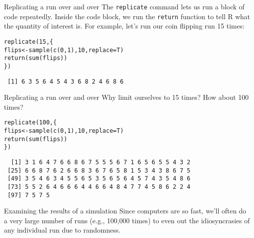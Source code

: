 \documentclass{beamer}\usepackage[]{graphicx}\usepackage[]{color}
\makeatletter
\newcommand{\hlnum}[1]{\textcolor[rgb]{0.824,0.412,0.118}{#1}}%
\newcommand{\hlstd}[1]{\textcolor[rgb]{1,0.894,0.769}{#1}}%
\newcommand{\hlkwb}[1]{\textcolor[rgb]{0.804,0.776,0.451}{#1}}%
\newcommand{\hlkwc}[1]{\textcolor[rgb]{0.78,0.941,0.545}{#1}}%
\newcommand{\hlkwd}[1]{\textcolor[rgb]{1,0.78,0.769}{#1}}%
\newenvironment{kframe}{%
 \def\at@end@of@kframe{}%
 \ifinner\ifhmode%
  \def\at@end@of@kframe{\end{minipage}}%
  \begin{minipage}{\columnwidth}%
 \fi\fi%
 \def\FrameCommand##1{\hskip\@totalleftmargin \hskip-\fboxsep
 \colorbox{shadecolor}{##1}\hskip-\fboxsep
     \hskip-\linewidth \hskip-\@totalleftmargin \hskip\columnwidth}%
 \MakeFramed {\advance\hsize-\width
   \@totalleftmargin\z@ \linewidth\hsize
   \@setminipage}}%
 {\par\unskip\endMakeFramed%
 \at@end@of@kframe}
\newenvironment{knitrout}{}{} %
\makeatother
\begin{document}
\begin{darkframes}
\begin{frame}[fragile]{Replicating a run over and over}
      The \texttt{replicate} command lets us run a block of code repeatedly. Inside the code block, we run the \texttt{return} function to tell R what the quantity of interest is. For example, let's run our coin flipping run 15 times:

\begin{knitrout}
\begin{kframe}
\begin{alltt}
\hlkwd{replicate}\hlstd{(}\hlnum{15}\hlstd{, \{}
  \hlstd{flips} \hlkwb{<-} \hlkwd{sample}\hlstd{(}\hlkwd{c}\hlstd{(}\hlnum{0}\hlstd{,} \hlnum{1}\hlstd{),} \hlnum{10}\hlstd{,} \hlkwc{replace}\hlstd{=T)}
  \hlkwd{return}\hlstd{(}\hlkwd{sum}\hlstd{(flips))}
\hlstd{\})}
\end{alltt}
\begin{verbatim}
 [1] 6 3 5 6 4 5 4 3 6 8 2 4 6 8 6
\end{verbatim}
\end{kframe}
\end{knitrout}
    \end{frame}

    \begin{frame}[fragile]{Replicating a run over and over}
      Why limit ourselves to 15 times? How about 100 times?
      \pause

\begin{knitrout}
\begin{kframe}
\begin{alltt}
\hlkwd{replicate}\hlstd{(}\hlnum{100}\hlstd{, \{}
  \hlstd{flips} \hlkwb{<-} \hlkwd{sample}\hlstd{(}\hlkwd{c}\hlstd{(}\hlnum{0}\hlstd{,} \hlnum{1}\hlstd{),} \hlnum{10}\hlstd{,} \hlkwc{replace}\hlstd{=T)}
  \hlkwd{return}\hlstd{(}\hlkwd{sum}\hlstd{(flips))}
\hlstd{\})}
\end{alltt}
\begin{verbatim}
  [1] 3 1 6 4 7 6 6 8 6 7 5 5 5 6 7 1 6 5 6 5 5 4 3 2
 [25] 6 6 8 7 6 2 6 6 8 3 6 7 6 5 8 1 5 3 4 3 8 6 7 5
 [49] 3 5 4 6 3 4 5 5 6 5 3 5 6 5 6 4 5 7 4 3 5 4 8 6
 [73] 5 5 2 6 4 6 6 6 4 4 6 6 4 8 4 7 7 4 5 8 6 2 2 4
 [97] 7 5 7 5
\end{verbatim}
\end{kframe}
\end{knitrout}
    \end{frame}

    \begin{frame}{Examining the results of a simulation}
      Since computers are so fast, we'll often do a very large number of runs (e.g., 100,000 times) to even out the idiosyncrasies of any individual run due to randomness.


\end{frame}
\end{darkframes}
\end{document}

